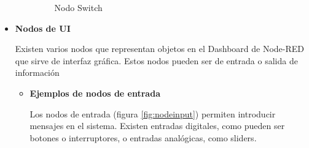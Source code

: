 \begin{itemize}
\begin{itemize}
\begin{figure}[H]
\begin{minipage}[b]{0.5\textwidth}
  \end{minipage}
  \caption{Nodo Switch}\label{fig:nodeexec}
\end{figure}

\end{itemize}


\item \textbf{Nodos de UI}

Existen varios nodos que representan objetos en el Dashboard de Node-RED que sirve de interfaz gráfica. Estos nodos pueden ser de entrada o salida de información

\begin{itemize}
\item \textbf{Ejemplos de nodos de entrada}

Los nodos de entrada (figura \ref{fig:nodeinput}) permiten introducir mensajes en el sistema. Existen entradas digitales, como pueden ser botones o interruptores, o entradas analógicas, como sliders.


\end{itemize}
\end{itemize}
